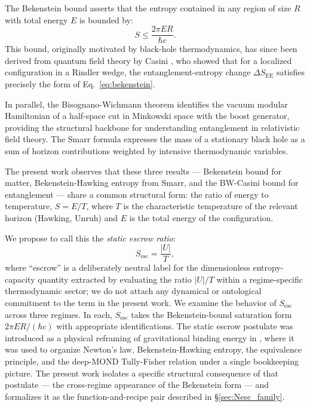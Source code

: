 \documentclass[11pt]{article}
\begin{document}
The Bekenstein bound \cite{Bekenstein1981} asserts that the entropy contained in any region of size $R$ with total energy $E$ is bounded by:
\begin{equation}
S \leq \frac{2\pi E R}{\hbar c}.
\label{eq:bekenstein}
\end{equation}
This bound, originally motivated by black-hole thermodynamics, has since been derived from quantum field theory by Casini \cite{Casini2008}, who showed that for a localized configuration in a Rindler wedge, the entanglement-entropy change $\Delta S_{\mathrm{EE}}$ satisfies precisely the form of Eq.~\ref{eq:bekenstein}.

In parallel, the Bisognano-Wichmann theorem \cite{BisognanoWichmann1975, BisognanoWichmann1976} identifies the vacuum modular Hamiltonian of a half-space cut in Minkowski space with the boost generator, providing the structural backbone for understanding entanglement in relativistic field theory. The Smarr formula \cite{Smarr1973} expresses the mass of a stationary black hole as a sum of horizon contributions weighted by intensive thermodynamic variables.

The present work observes that these three results — Bekenstein bound for matter, Bekenstein-Hawking entropy from Smarr, and the BW-Casini bound for entanglement — share a common structural form: the ratio of energy to temperature, $S = E/T$, where $T$ is the characteristic temperature of the relevant horizon (Hawking, Unruh) and $E$ is the total energy of the configuration.

We propose to call this the \emph{static escrow ratio}:
\begin{equation}
S_{\mathrm{esc}} = \frac{|U|}{T},
\label{eq:escrow}
\end{equation}
where ``escrow'' is a deliberately neutral label for the dimensionless entropy-capacity quantity extracted by evaluating the ratio $|U|/T$ within a regime-specific thermodynamic sector; we do not attach any dynamical or ontological commitment to the term in the present work. We examine the behavior of $S_{\mathrm{esc}}$ across three regimes. In each, $S_{\mathrm{esc}}$ takes the Bekenstein-bound saturation form $2\pi E R/(\hbar c)$ with appropriate identifications. The static escrow postulate was introduced as a physical reframing of gravitational binding energy in \cite{Whitmer2026Escrow}, where it was used to organize Newton's law, Bekenstein-Hawking entropy, the equivalence principle, and the deep-MOND Tully-Fisher relation under a single bookkeeping picture. The present work isolates a specific structural consequence of that postulate — the cross-regime appearance of the Bekenstein form — and formalizes it as the function-and-recipe pair described in \S\ref{sec:Nesc_family}.
\end{document}
